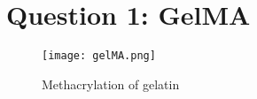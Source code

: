 \section{Question 1: GelMA}

\begin{figure}[H]
    \texttt{[image: gelMA.png]}
    \caption{Methacrylation of gelatin}
    \label{fig:gelMA}
\end{figure}